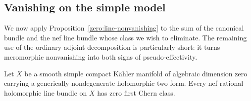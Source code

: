 \subsection{Vanishing on the simple model}

We now apply Proposition~\ref{zero:line-nonvanishing} to the sum of
the canonical bundle and the nef line bundle whose class we wish to
eliminate.  The remaining use of the ordinary adjoint
decomposition is particularly short: it turns meromorphic
nonvanishing into both signs of pseudo-effectivity.

\begin{proposition}\label{zero:simple-vanishing}
Let \(X\) be a smooth simple compact Kähler manifold of algebraic
dimension zero carrying a generically nondegenerate holomorphic
two-form.  Every nef rational holomorphic line bundle on \(X\) has zero
first Chern class.
\end{proposition}


